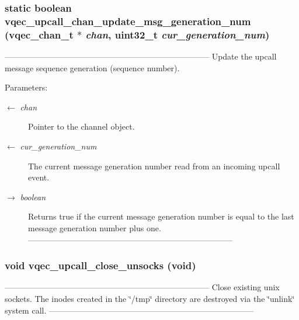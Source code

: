 \subsubsection{\setlength{\rightskip}{0pt plus 5cm}static boolean vqec\_\-upcall\_\-chan\_\-update\_\-msg\_\-generation\_\-num (\bf{vqec\_\-chan\_\-t} $\ast$ {\em chan}, uint32\_\-t {\em cur\_\-generation\_\-num})\hspace{0.3cm}{\tt  [static]}}\label{vqec__upcall__event_8c_0309081af62e2ac77acef166e7edcd7f}


--------------------------------------------------------------------------- Update the upcall message sequence generation (sequence number).

\begin{Desc}
\item[Parameters:]
\begin{description}
\item[\mbox{$\leftarrow$} {\em chan}]Pointer to the channel object. \item[\mbox{$\leftarrow$} {\em cur\_\-generation\_\-num}]The current message generation number read from an incoming upcall event. \item[\mbox{$\rightarrow$} {\em boolean}]Returns true if the current message generation number is equal to the last message generation number plus one. --------------------------------------------------------------------------- \end{description}
\end{Desc}
\subsubsection{\setlength{\rightskip}{0pt plus 5cm}void vqec\_\-upcall\_\-close\_\-unsocks (void)}\label{vqec__upcall__event_8c_020466839798c4aa443c388dfe065188}


--------------------------------------------------------------------------- Close existing unix sockets. The inodes created in the \char`\"{}/tmp\char`\"{} directory are destroyed via the \char`\"{}unlink\char`\"{} system call. --------------------------------------------------------------------------- 
